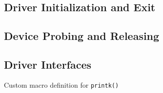 \subsection{Driver Initialization and Exit}

\subsection{Device Probing and Releasing}

\subsection{Driver Interfaces}

\begin{listing} [ht]
	\caption{Custom macro definition for \texttt{printk()}}
	\label{lst:printk-macro}
	\begin{verbatim}

	\end{verbatim}
\end{listing}


